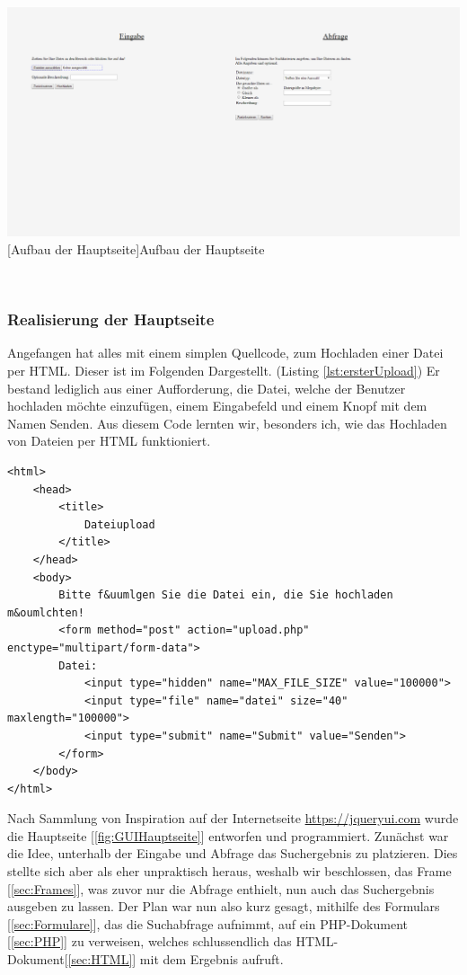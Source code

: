 \documentclass[12pt,a4paper,bibliography=totocnumbered,listof=totocnumbered]{scrartcl}
\begin{document}
\vspace{1em}
\begin{minipage}{\linewidth}
	\centering
	\includegraphics[width=0.7\linewidth]{Bilder/GUIHauptseite.png}
	[Aufbau der Hauptseite]{Aufbau der Hauptseite}
	\label{fig:GUIHauptseite}
\end{minipage}
\\

\subsubsection{Realisierung der Hauptseite}
\label{RealisierungHauptseite}
Angefangen hat alles mit einem simplen Quellcode, zum Hochladen einer Datei per HTML. Dieser ist im Folgenden Dargestellt. (Listing \ref{lst:ersterUpload}) Er bestand lediglich aus einer Aufforderung, die Datei, welche der Benutzer hochladen möchte einzufügen, einem Eingabefeld und einem Knopf mit dem Namen \glqq Senden\grqq . Aus diesem Code lernten wir, besonders ich, wie das Hochladen von Dateien per HTML funktioniert. 

\vspace{1em}
\begin{lstlisting}[caption=Erste Version des Datei-Uploads, label=lst:ersterUpload]
<html>
	<head>
		<title>
			Dateiupload
		</title>
	</head>
	<body>
		Bitte f&uumlgen Sie die Datei ein, die Sie hochladen m&oumlchten!
		<form method="post" action="upload.php" enctype="multipart/form-data">
		Datei:
			<input type="hidden" name="MAX_FILE_SIZE" value="100000">
			<input type="file" name="datei" size="40" maxlength="100000">
			<input type="submit" name="Submit" value="Senden">
		</form>
	</body>
</html>
\end{lstlisting}

Nach Sammlung von Inspiration auf der Internetseite \url{https://jqueryui.com} wurde die Hauptseite [\ref{fig:GUIHauptseite}] entworfen und programmiert. Zunächst war die Idee, unterhalb der Eingabe und Abfrage das Suchergebnis zu platzieren. Dies stellte sich aber als eher unpraktisch heraus, weshalb wir beschlossen, das Frame [\ref{sec:Frames}], was zuvor nur die Abfrage enthielt, nun auch das Suchergebnis ausgeben zu lassen. Der Plan war nun also kurz gesagt, mithilfe des Formulars [\ref{sec:Formulare}], das die Suchabfrage aufnimmt, auf ein PHP-Dokument [\ref{sec:PHP}] zu verweisen, welches schlussendlich das HTML-Dokument[\ref{sec:HTML}] mit dem Ergebnis aufruft. \\
\end{document}
